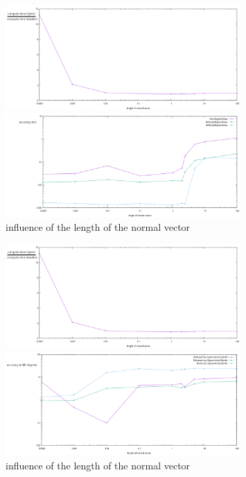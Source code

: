 \begin{figure}
	\centering
	\begin{minipage}{\textwidth}
		\includegraphics[width=0.8\textwidth]{figures/NormVsTime.pdf}
	\end{minipage}
	\begin{minipage}{\textwidth}
		\includegraphics[width=0.8\textwidth]{figures/NormVsSigmaTime.pdf}
	\end{minipage}
\caption{influence of the length of the normal vector}
\label{fig:norminfl}
\end{figure}
\begin{figure}
	\centering
	\begin{minipage}{\textwidth}
		\includegraphics[width=0.8\textwidth]{figures/NormVsTime.pdf}
	\end{minipage}
	\begin{minipage}{\textwidth}
		\includegraphics[width=0.8\textwidth]{figures/NormVsSigmaAZ.pdf}
	\end{minipage}
\caption{influence of the length of the normal vector}
\label{fig:norminfl2}
\end{figure}

